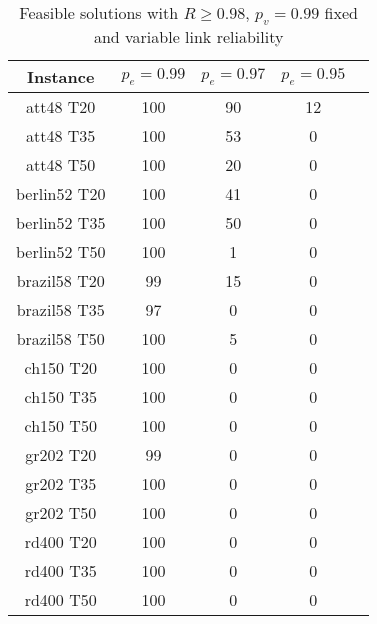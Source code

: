 \documentclass{llncs}
\begin{document}
\begin{table}
\caption{Feasible solutions with $R \geq 0.98$,  
$p_v=0.99$ fixed and variable link reliability} %
\centering  %
\begin{tabular}{|c|c|c|c|c|} %
\hline	Instance  &	$p_e=0.99$ & 	$p_e=0.97$ & 	$p_e=0.95$\\
\hline	att48 T20	&	100	&	90	&	12	\\
\hline	att48 T35	&	100	&	53	&	0	\\
\hline	att48 T50	&	100	&	20	&	0	\\
\hline	berlin52 T20	&	100	&	41	&	0	\\
\hline	berlin52 T35	&	100	&	50	&	0	\\
\hline	berlin52 T50	&	100	&	1	&	0	\\
\hline	brazil58 T20	&	99	&	15	&	0	\\
\hline	brazil58 T35	&	97	&	0	&	0	\\
\hline	brazil58 T50	&	100	&	5	&	0	\\
\hline	ch150 T20	&	100	&	0	&	0	\\
\hline	ch150 T35	&	100	&	0	&	0	\\
\hline	ch150 T50	&	100	&	0	&	0	\\
\hline	gr202 T20	&	99	&	0	&	0	\\
\hline	gr202 T35	&	100	&	0	&	0	\\
\hline	gr202 T50	&	100	&	0	&	0	\\
\hline	rd400 T20	&	100	&	0	&	0	\\
\hline	rd400 T35	&	100	&	0	&	0	\\
\hline	rd400 T50	&	100	&	0	&	0	\\
\hline
\end{tabular}
\label{answer2a} %
\end{table}
\end{document}

